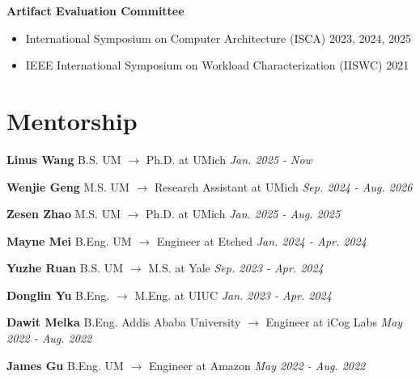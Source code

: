 \documentclass[10pt,a4paper,palatine]{moderncv}        %
\begin{document}
\textbf{Artifact Evaluation Committee}
\begin{itemize}
    \item International Symposium on Computer Architecture (ISCA) 2023, 2024, 2025
    \item IEEE International Symposium on Workload Characterization (IISWC) 2021
\end{itemize}
\vspace{-2mm}

\section{Mentorship}

\textbf{Linus Wang} B.S. UM $\rightarrow$ Ph.D. at UMich \hfill {\itshape Jan. 2025 - Now}
\vspace{-2mm}

\textbf{Wenjie Geng} M.S. UM $\rightarrow$ Research Assistant at UMich \hfill {\itshape Sep. 2024 - Aug. 2026}
\vspace{-2mm}

\textbf{Zesen Zhao} M.S. UM $\rightarrow$ Ph.D. at UMich \hfill {\itshape Jan. 2025 - Aug. 2025}
\vspace{-2mm}

\textbf{Mayne Mei} B.Eng. UM $\rightarrow$ Engineer at Etched \hfill {\itshape Jan. 2024 - Apr. 2024}
\vspace{-2mm}

\textbf{Yuzhe Ruan} B.S. UM $\rightarrow$ M.S. at Yale \hfill {\itshape Sep. 2023 - Apr. 2024}
\vspace{-2mm}

\textbf{Donglin Yu} B.Eng. $\rightarrow$ M.Eng. at UIUC \hfill {\itshape Jan. 2023 - Apr. 2024}
\vspace{-2mm}

\textbf{Dawit Melka} B.Eng. Addis Ababa University $\rightarrow$ Engineer at iCog Labs \hfill {\itshape May 2022 - Aug. 2022}
\vspace{-2mm}

\textbf{James Gu} B.Eng. UM $\rightarrow$ Engineer at Amazon \hfill {\itshape May 2022 - Aug. 2022}
\vspace{-2mm}

      
\end{document}
